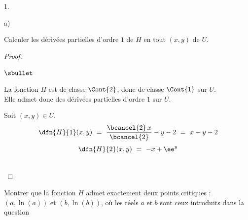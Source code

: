 \documentclass[11pt]{article}%
\begin{document}
\begin{noliste}{1.}
  \setlength{\itemsep}{4mm}
  \setcounter{enumi}{12}
  \item 
  \begin{noliste}{a)}
    \setlength{\itemsep}{2mm}
    \item Calculer les dérivées partielles d'ordre $1$ de $H$ en tout 
    $(x,y)$ de $U$.
    
    \begin{proof}~
      \begin{noliste}{$\sbullet$}
	\item La fonction $H$ est de classe $\Cont{2}$, donc de classe 
	$\Cont{1}$ sur $U$.\\
	Elle admet donc des dérivées partielles d'ordre $1$ sur $U$.
	
	\item Soit $(x,y) \in U$.
	\[
	  \dfn{H}{1}(x,y) \ = \ \dfrac{\bcancel{2} \, x}{\bcancel{2}} -y
	  -2 \ = \ x-y-2
	\]
	\[
	  \dfn{H}{2}(x,y) \ = \ -x + \ee^y
	\]
      \end{noliste}
      
      ~\\[-1.4cm]
    \end{proof}
    
    
    
    
    \item Montrer que la fonction $H$ admet exactement deux points 
    critiques : $(a, \ln(a))$ et $(b,\ln(b))$, où les réels $a$ et $b$
    sont ceux introduits dans la question 
    

\end{noliste}
\end{noliste}
\end{document}
